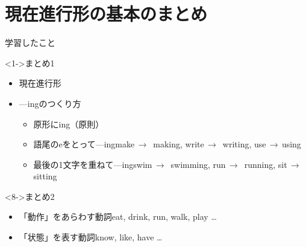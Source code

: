 \documentclass[aspectratio=169,xcolor={dvipsnames,table}]{beamer}
\begin{document}
\section{現在進行形の基本のまとめ}
\begin{frame}[plain]{学習したこと}\small
\begin{block}<1->{まとめ1}
\begin{itemize}[square]
 \item<2-> 現在進行形\,\,\hfill{}
 \item<4-> ---ingのつくり方
       \begin{itemize}
	\item<5-> 原形にing（原則）
	\item<6-> 語尾のeをとって---ing\hfill{}make\,$\rightarrow$\, making, write\,$\rightarrow$\, writing, use\,$\rightarrow$\,using
	\item<7-> 最後の1文字を重ねて---ing\hfill{}swim\,$\rightarrow$\, swimming, run\,$\rightarrow$\, running, sit\,$\rightarrow$\,sitting
       \end{itemize}
\end{itemize}
 \end{block}
\begin{block}<8->{まとめ2}\small
{}
\begin{itemize}[square]
 \item 「動作」をあらわす動詞\hfill{}eat, drink,  run, walk, play \ldots
 \item 「状態」を表す動詞\hfill{}know, like, have \ldots\\
\hfill{}\\
\hfill{}\\%
\hfill{}%
\end{itemize}
 \end{block}
\end{frame}
\end{document}
